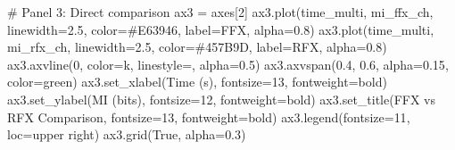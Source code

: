 \documentclass[
  11pt,
  letterpaper,
  oneside,
  openany]{book}
\newenvironment{Shaded}{\begin{snugshade}}{\end{snugshade}}
\newcommand{\CommentTok}[1]{\textcolor[rgb]{0.37,0.37,0.37}{#1}}
\newcommand{\DecValTok}[1]{\textcolor[rgb]{0.68,0.00,0.00}{#1}}
\newcommand{\FloatTok}[1]{\textcolor[rgb]{0.68,0.00,0.00}{#1}}
\newcommand{\NormalTok}[1]{\textcolor[rgb]{0.00,0.23,0.31}{#1}}
\newcommand{\OperatorTok}[1]{\textcolor[rgb]{0.37,0.37,0.37}{#1}}
\newcommand{\StringTok}[1]{\textcolor[rgb]{0.13,0.47,0.30}{#1}}
\newcommand{\VariableTok}[1]{\textcolor[rgb]{0.07,0.07,0.07}{#1}}
\begin{document}
\begin{Shaded}
\begin{Highlighting}[]
\CommentTok{\# Panel 3: Direct comparison}
\NormalTok{ax3 }\OperatorTok{=}\NormalTok{ axes[}\DecValTok{2}\NormalTok{]}
\NormalTok{ax3.plot(time\_multi, mi\_ffx\_ch, linewidth}\OperatorTok{=}\FloatTok{2.5}\NormalTok{, color}\OperatorTok{=}\StringTok{\textquotesingle{}\#E63946\textquotesingle{}}\NormalTok{, }
\NormalTok{         label}\OperatorTok{=}\StringTok{\textquotesingle{}FFX\textquotesingle{}}\NormalTok{, alpha}\OperatorTok{=}\FloatTok{0.8}\NormalTok{)}
\NormalTok{ax3.plot(time\_multi, mi\_rfx\_ch, linewidth}\OperatorTok{=}\FloatTok{2.5}\NormalTok{, color}\OperatorTok{=}\StringTok{\textquotesingle{}\#457B9D\textquotesingle{}}\NormalTok{, }
\NormalTok{         label}\OperatorTok{=}\StringTok{\textquotesingle{}RFX\textquotesingle{}}\NormalTok{, alpha}\OperatorTok{=}\FloatTok{0.8}\NormalTok{)}
\NormalTok{ax3.axvline(}\DecValTok{0}\NormalTok{, color}\OperatorTok{=}\StringTok{\textquotesingle{}k\textquotesingle{}}\NormalTok{, linestyle}\OperatorTok{=}\StringTok{\textquotesingle{}{-}{-}\textquotesingle{}}\NormalTok{, alpha}\OperatorTok{=}\FloatTok{0.5}\NormalTok{)}
\NormalTok{ax3.axvspan(}\FloatTok{0.4}\NormalTok{, }\FloatTok{0.6}\NormalTok{, alpha}\OperatorTok{=}\FloatTok{0.15}\NormalTok{, color}\OperatorTok{=}\StringTok{\textquotesingle{}green\textquotesingle{}}\NormalTok{)}
\NormalTok{ax3.set\_xlabel(}\StringTok{\textquotesingle{}Time (s)\textquotesingle{}}\NormalTok{, fontsize}\OperatorTok{=}\DecValTok{13}\NormalTok{, fontweight}\OperatorTok{=}\StringTok{\textquotesingle{}bold\textquotesingle{}}\NormalTok{)}
\NormalTok{ax3.set\_ylabel(}\StringTok{\textquotesingle{}MI (bits)\textquotesingle{}}\NormalTok{, fontsize}\OperatorTok{=}\DecValTok{12}\NormalTok{, fontweight}\OperatorTok{=}\StringTok{\textquotesingle{}bold\textquotesingle{}}\NormalTok{)}
\NormalTok{ax3.set\_title(}\StringTok{\textquotesingle{}FFX vs RFX Comparison\textquotesingle{}}\NormalTok{, fontsize}\OperatorTok{=}\DecValTok{13}\NormalTok{, fontweight}\OperatorTok{=}\StringTok{\textquotesingle{}bold\textquotesingle{}}\NormalTok{)}
\NormalTok{ax3.legend(fontsize}\OperatorTok{=}\DecValTok{11}\NormalTok{, loc}\OperatorTok{=}\StringTok{\textquotesingle{}upper right\textquotesingle{}}\NormalTok{)}
\NormalTok{ax3.grid(}\VariableTok{True}\NormalTok{, alpha}\OperatorTok{=}\FloatTok{0.3}\NormalTok{)}


\end{Highlighting}
\end{Shaded}
\end{document}
